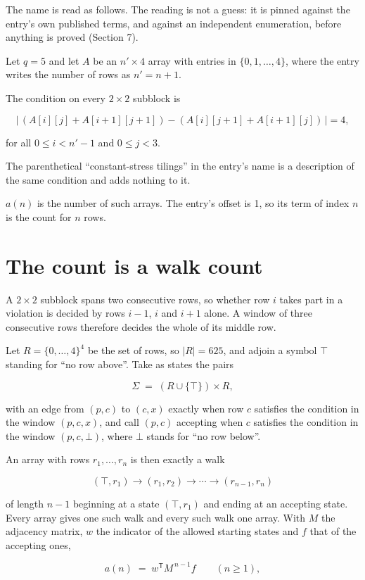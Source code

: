 \documentclass[11pt]{article}
\theoremstyle{definition}
\begin{document}
The name is read as follows. The reading is not a guess: it is pinned against the entry's own published terms, and against an independent enumeration, before anything is proved (Section 7).

Let $q = 5$ and let $A$ be an $n' \times 4$ array with entries in $\{0,1,\dots,4\}$, where the entry writes the number of rows as $n' = n + 1$.

The condition on every $2 \times 2$ subblock is

\[\bigl|\,(A[i][j] + A[i{+}1][j{+}1]) - (A[i][j{+}1] + A[i{+}1][j])\,\bigr| = 4,\]

for all $0 \le i < n'-1$ and $0 \le j < 3$.

The parenthetical ``constant-stress tilings'' in the entry's name is a description of the same condition and adds nothing to it.

$a(n)$ is the number of such arrays. The entry's offset is 1, so its term of index $n$ is the count for $n$ rows.

\section{The count is a walk count}

A $2 \times 2$ subblock spans two consecutive rows, so whether row $i$ takes part in a violation is decided by rows $i-1$, $i$ and $i+1$ alone. A window of three consecutive rows therefore decides the whole of its middle row.

Let $R = \{0,\dots,4\}^{4}$ be the set of rows, so $|R| = 625$, and adjoin a symbol $\top$ standing for ``no row above''. Take as states the pairs

\[\Sigma \;=\; (R \cup \{\top\}) \times R,\]

with an edge from $(p,c)$ to $(c,x)$ exactly when row $c$ satisfies the condition in the window $(p,c,x)$, and call $(p,c)$ accepting when $c$ satisfies the condition in the window $(p,c,\bot)$, where $\bot$ stands for ``no row below''.

An array with rows $r_1,\dots,r_n$ is then exactly a walk

\[(\top,r_1) \to (r_1,r_2) \to \cdots \to (r_{n-1},r_n)\]

of length $n-1$ beginning at a state $(\top,r_1)$ and ending at an accepting state. Every array gives one such walk and every such walk one array. With $M$ the adjacency matrix, $w$ the indicator of the allowed starting states and $f$ that of the accepting ones,

\[a(n) \;=\; w^{\mathsf T} M^{\,n-1} f \qquad (n \ge 1),\]
\end{document}
